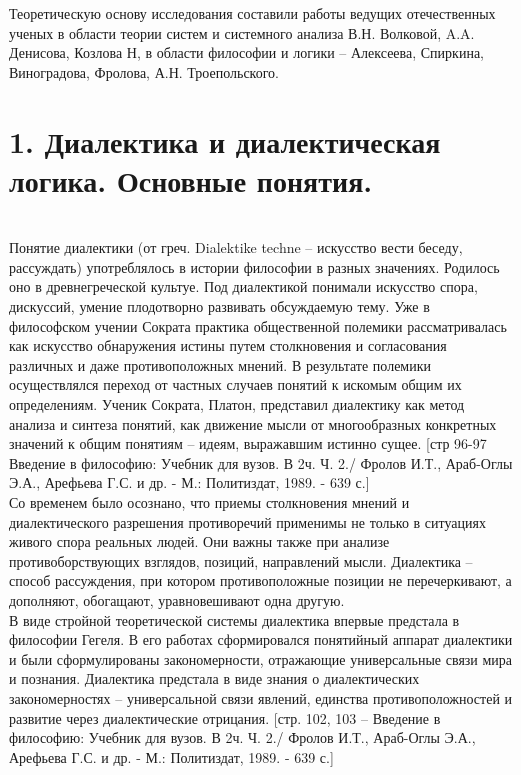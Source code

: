 \documentclass[a4paper,12pt]{report}
\begin{document}
	Теоретическую основу исследования составили работы ведущих отечественных ученых в области теории систем и системного анализа В.Н. Волковой, A.A. Денисова, Козлова Н, в области философии и логики  – Алексеева, Спиркина, Виноградова, Фролова, А.Н. Троепольского.\\



\chapter*{1.  Диалектика и диалектическая логика. Основные понятия. }
 \\

Понятие диалектики (от греч. Dialektike techne – искусство вести беседу, рассуждать) употреблялось в истории философии в разных значениях. Родилось оно в древнегреческой культуе. Под диалектикой понимали искусство спора, дискуссий, умение плодотворно развивать обсуждаемую тему. Уже в философском учении Сократа практика общественной полемики рассматривалась как искусство обнаружения истины путем столкновения и согласования различных и даже противоположных мнений. В результате полемики осуществлялся переход от частных случаев понятий к искомым общим их определениям. Ученик Сократа, Платон, представил диалектику как метод анализа и синтеза понятий, как движение мысли от многообразных конкретных значений к общим понятиям – идеям, выражавшим истинно сущее. [стр 96-97  Введение в философию: Учебник для вузов. В 2ч. Ч. 2./ Фролов И.Т., Араб-Оглы Э.А., Арефьева Г.С. и др. - М.: Политиздат, 1989. - 639 с.] \\

	Со временем было осознано, что приемы столкновения мнений и диалектического разрешения противоречий применимы не только в ситуациях живого спора реальных людей. Они важны также при анализе противоборствующих взглядов, позиций, направлений мысли. Диалектика – способ рассуждения, при котором противоположные позиции не перечеркивают, а дополняют, обогащают, уравновешивают одна другую. \\

	В виде стройной теоретической системы диалектика впервые предстала в философии Гегеля. В его работах сформировался понятийный аппарат диалектики и были сформулированы закономерности, отражающие универсальные связи мира и познания. Диалектика предстала в виде знания о диалектических закономерностях – универсальной связи явлений, единства противоположностей и развитие через диалектические отрицания.  [стр. 102, 103 – Введение в философию: Учебник для вузов. В 2ч. Ч. 2./ Фролов И.Т., Араб-Оглы Э.А., Арефьева Г.С. и др. - М.: Политиздат, 1989. - 639 с.]\\
\end{document}
